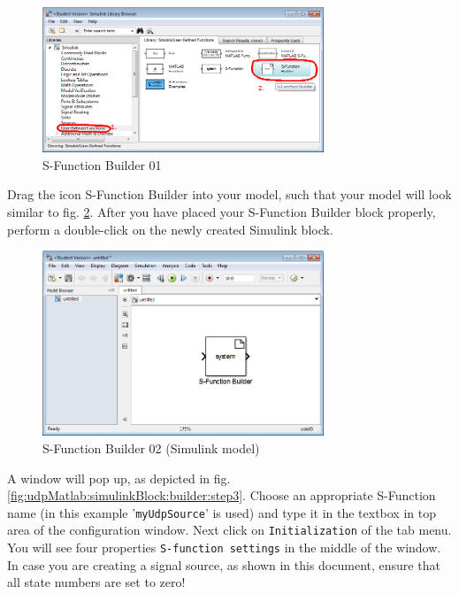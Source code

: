 \begin{figure}[H]
    \centering
    \includegraphics[width=0.75\textwidth]{fig/ch-matlab-lib/sFuncBuilder_matlabLibrary}
    \caption{S-Function Builder 01}
    \label{fig:udpMatlab:simulinkBlock:builder:step1}
\end{figure}

Drag the icon S-Function Builder into your model, such that your model will look similar to fig. \ref{fig:udpMatlab:simulinkBlock:builder:step2}. After you have placed your S-Function Builder block properly, perform a double-click on the newly created Simulink block.

\begin{figure}[H]
    \centering
    \includegraphics[width=0.75\textwidth]{fig/ch-matlab-lib/sFuncBuilder_matlabModel_00}
    \caption{S-Function Builder 02 (Simulink model)}
    \label{fig:udpMatlab:simulinkBlock:builder:step2}
\end{figure}

A window will pop up, as depicted in fig. \ref{fig:udpMatlab:simulinkBlock:builder:step3}. Choose an appropriate S-Function name (in this example '\texttt{myUdpSource}' is used) and type it in the textbox in top area of the configuration window. Next click on \texttt{Initialization} of the tab menu. You will see four properties \texttt{S-function settings} in the middle of the window. In case you are creating a signal source, as shown in this document, ensure that all state numbers are set to zero!


